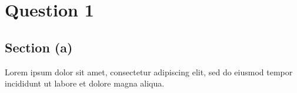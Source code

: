 \section{Question 1}
\subsection{Section (a)}

Lorem ipsum dolor sit amet, consectetur adipiscing elit, sed do eiusmod tempor incididunt ut labore et dolore magna aliqua.

